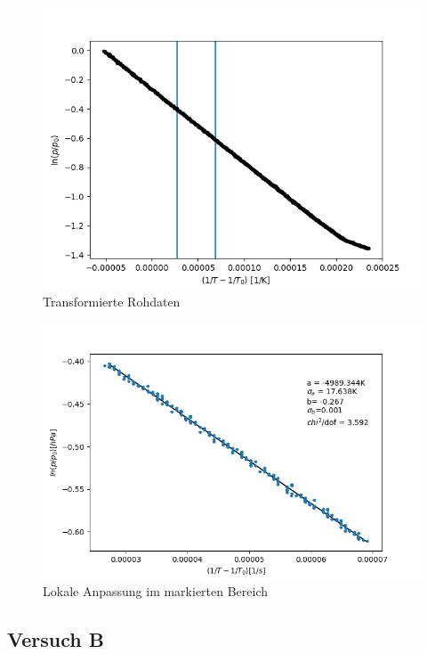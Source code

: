 \documentclass[12pt,a4paper]{article}
\begin{document}
\begin{figure}
\includegraphics[width=\linewidth]{Bilder/log_RohdatenA.png}
\caption[]{Transformierte Rohdaten}
\label{fig:logA}
\end{figure}

\begin{figure}
\includegraphics[width=\linewidth]{Bilder/lokaler_fit_2A.png}
\caption[]{Lokale Anpassung im markierten Bereich}
\label{fig:fit_2A}
\end{figure}


\subsection{Versuch B}
\end{document}
